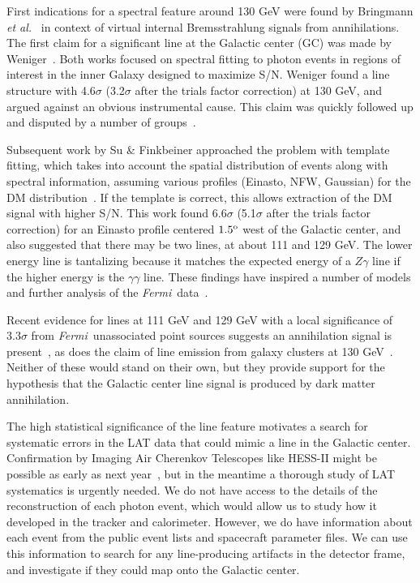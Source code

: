 \documentclass[aps,twocolumn,prd,superscriptaddress,showpacs,nofootinbib,fixfloat]{revtex4}
\newcommand{\Fermi}{{\slshape Fermi}}
\newcommand{\degree}{^{\rm o}}
\begin{document}
First indications for a spectral feature around 130 GeV were found by
Bringmann \textit{et al.}~\citep{Bringmann:2012} in context of virtual
internal Bremsstrahlung signals from annihilations. The first claim for a
significant line at the Galactic center (GC) was made by
Weniger~\citep{Weniger:2012}.
Both works
focused on spectral fitting to photon events in regions of interest in
the inner Galaxy designed to maximize S/N. Weniger found a line structure
with 4.6$\sigma$ (3.2$\sigma$ after the trials factor
correction) at 130 GeV, and argued against an obvious instrumental cause.
This claim was quickly followed up and disputed by a number of
groups~\cite{tempel:2012ey, Boyarsky:2012ca}.

Subsequent work by Su \& Finkbeiner approached the problem
with template fitting, which takes into account the spatial
distribution of events along with spectral information,
assuming various profiles (Einasto, NFW, Gaussian) for the
DM distribution~\citep{linepaper}.  If the template is
correct, this allows extraction of the DM signal with higher
S/N.  This work found 6.6$\sigma$ (5.1$\sigma$ after the
trials factor correction) for an Einasto profile centered
$1.5\degree$ west of the Galactic center, and also suggested
that there may be two lines, at about 111 and 129 GeV.  The
lower energy line is tantalizing because it matches the
expected energy of a $Z\gamma$ line if the higher energy is
the $\gamma\gamma$ line.  These findings have inspired a
number of models and further analysis of the \Fermi\
data~\citep{Dudas:2012, Choi:2012, Kyae:2012, Lee:2012,
Rajaraman:2012, Acharya:2012, Garny:2012, Buckley:2012,
Chu:2012, Kang:2012, Buchmuller:2012, Bergstrom:2012b,
Heo:2012, Park:2012, Tulin:2012, Cline:2012, Weiner:2012,
WeinerYavin:2012b, FanReece:2012, Huang:2012, Whiteson:2012,
Buchmuller:2012, Cholis:2012}.

Recent evidence for lines at 111 GeV and 129 GeV with a
local significance of $3.3\sigma$ from \Fermi\ unassociated
point sources suggests an annihilation signal is
present~\cite{doubleline}\citep[but
see][]{HooperLinden:2012b}, as does the claim of line
emission from galaxy clusters at 130
GeV~\cite{Hektor:2012kc}.  Neither of these would stand on
their own, but they provide support for the hypothesis that
the Galactic center line signal is produced by dark matter
annihilation.

The high statistical significance of the line feature
motivates a search for systematic errors in the LAT data
that could mimic a line in the Galactic center.
Confirmation by Imaging Air Cherenkov Telescopes like
HESS-II might be possible as early as next
year~\cite{Bergstrom:2012}, but in the meantime a thorough
study of LAT systematics is urgently needed.  We do not have
access to the details of the reconstruction of each photon
event, which would allow us to study how it developed in the
tracker and calorimeter.  However, we do have information
about each event from the public event lists and spacecraft
parameter files.  We can use this information to search for
any line-producing artifacts in the detector frame, and
investigate if they could map onto the Galactic center.
\end{document}
